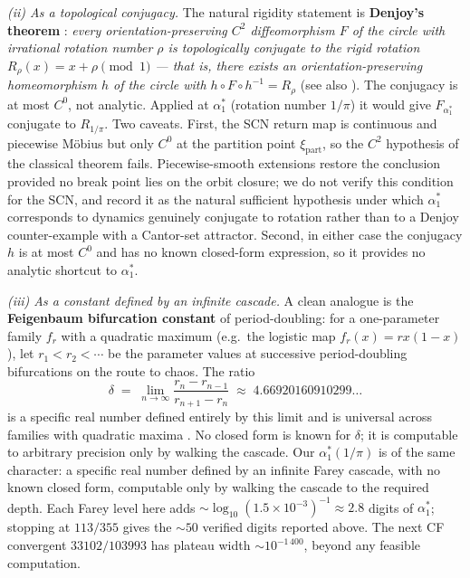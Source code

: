 \emph{(ii) As a topological conjugacy.} The natural rigidity statement is \textbf{Denjoy's theorem} \citep{denjoy1932courbes}: \emph{every orientation-preserving $C^2$ diffeomorphism $F$ of the circle with irrational rotation number $\rho$ is topologically conjugate to the rigid rotation $R_\rho(x)=x+\rho\pmod 1$ --- that is, there exists an orientation-preserving homeomorphism $h$ of the circle with $h\circ F\circ h^{-1}=R_\rho$} (see also \citealp{herman1979conjugaison}). The conjugacy is at most $C^0$, not analytic. Applied at $\alpha_1^*$ (rotation number $1/\pi$) it would give $F_{\alpha_1^*}$ conjugate to $R_{1/\pi}$. Two caveats. First, the SCN return map is continuous and piecewise M\"obius but only $C^0$ at the partition point $\xi_{\mathrm{part}}$, so the $C^2$ hypothesis of the classical theorem fails. Piecewise-smooth extensions \citep{liousse2005nombre} restore the conclusion provided no break point lies on the orbit closure; we do not verify this condition for the SCN, and record it as the natural sufficient hypothesis under which $\alpha_1^*$ corresponds to dynamics genuinely conjugate to rotation rather than to a Denjoy counter-example with a Cantor-set attractor. Second, in either case the conjugacy $h$ is at most $C^0$ and has no known closed-form expression, so it provides no analytic shortcut to $\alpha_1^*$.

\emph{(iii) As a constant defined by an infinite cascade.} A clean analogue is the \textbf{Feigenbaum bifurcation constant} of period-doubling: for a one-parameter family $f_r$ with a quadratic maximum (e.g.~the logistic map $f_r(x)=rx(1-x)$), let $r_1<r_2<\cdots$ be the parameter values at successive period-doubling bifurcations on the route to chaos. The ratio
\[
\delta \;=\; \lim_{n\to\infty}\frac{r_n-r_{n-1}}{r_{n+1}-r_n} \;\approx\; 4.66920160910299\ldots
\]
is a specific real number defined entirely by this limit and is universal across families with quadratic maxima \citep{feigenbaum1978quantitative}. No closed form is known for $\delta$; it is computable to arbitrary precision only by walking the cascade. Our $\alpha_1^*(1/\pi)$ is of the same character: a specific real number defined by an infinite Farey cascade, with no known closed form, computable only by walking the cascade to the required depth. Each Farey level here adds ${\sim}\log_{10}(1.5{\times}10^{-3})^{-1}\approx 2.8$ digits of $\alpha_1^*$; stopping at $113/355$ gives the ${\sim}50$ verified digits reported above. The next CF convergent $33102/103993$ has plateau width $\sim 10^{-1\,400}$, beyond any feasible computation.
